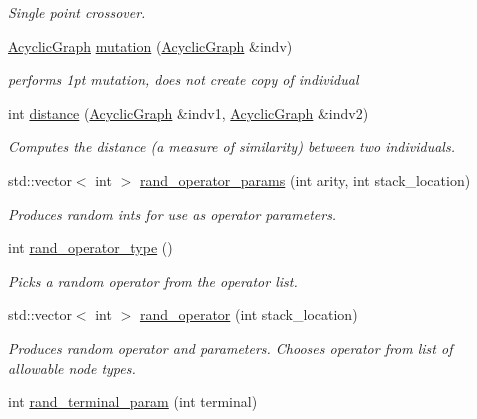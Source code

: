 \begin{DoxyCompactItemize}
\begin{DoxyCompactList}\small\item\em Single point crossover. \end{DoxyCompactList}\item 
\hyperlink{classAcyclicGraph}{Acyclic\+Graph} \hyperlink{classAcyclicGraphManipulator_aea8fbfeb0fbd0c8044aaa5ea50363cad}{mutation} (\hyperlink{classAcyclicGraph}{Acyclic\+Graph} \&indv)
\begin{DoxyCompactList}\small\item\em performs 1pt mutation, does not create copy of individual \end{DoxyCompactList}\item 
int \hyperlink{classAcyclicGraphManipulator_a4bee8f5802f96f250f71be70978aac92}{distance} (\hyperlink{classAcyclicGraph}{Acyclic\+Graph} \&indv1, \hyperlink{classAcyclicGraph}{Acyclic\+Graph} \&indv2)
\begin{DoxyCompactList}\small\item\em Computes the distance (a measure of similarity) between two individuals. \end{DoxyCompactList}\item 
std\+::vector$<$ int $>$ \hyperlink{classAcyclicGraphManipulator_affb7623093d462e3f03507c3b24f6fa4}{rand\+\_\+operator\+\_\+params} (int arity, int stack\+\_\+location)
\begin{DoxyCompactList}\small\item\em Produces random ints for use as operator parameters. \end{DoxyCompactList}\item 
int \hyperlink{classAcyclicGraphManipulator_a0989820d894340cd667e9b7a66203c7a}{rand\+\_\+operator\+\_\+type} ()
\begin{DoxyCompactList}\small\item\em Picks a random operator from the operator list. \end{DoxyCompactList}\item 
std\+::vector$<$ int $>$ \hyperlink{classAcyclicGraphManipulator_a7a2a7243ed3ee04a3ce424b1b9a9d594}{rand\+\_\+operator} (int stack\+\_\+location)
\begin{DoxyCompactList}\small\item\em Produces random operator and parameters. Chooses operator from list of allowable node types. \end{DoxyCompactList}\item 
int \hyperlink{classAcyclicGraphManipulator_ad664d50ba8dba3dce11d0d3136952806}{rand\+\_\+terminal\+\_\+param} (int terminal)

\end{DoxyCompactItemize}
